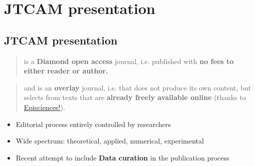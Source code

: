 \documentclass[10pt,compress,serif,aspectratio=169]{beamer}
\begin{document}



\section{JTCAM presentation}
\subsection{JTCAM presentation}
\begin{frame}[t]{}

\newline

  \begin{quote}
    is a {\huge \textbf{Diamond open access}} journal, i.e. published with \textbf{no fees to either reader or author.} \newline
\end{quote}

  \begin{quote}
      and is an {\huge \textbf{overlay}} journal, i.e. that does not produce its own content, but selects from texts that are \textbf{already freely available online} (thanks to \href{https://www.episciences.org/}{Episciences!}).
\newline
\end{quote}

 \begin{itemize}
 \item Editorial process entirely controlled by researchers   
 \item Wide spectrum: theoretical, applied, numerical, experimental
\pause
 \item Recent attempt to include \textbf{Data curation} in the publication process 

 \end{itemize}
\end{frame}
\end{document}
